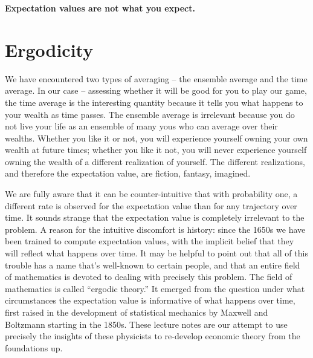 \textbf{Expectation values are not what you expect.}

\section{Ergodicity}

We have encountered two types of averaging -- the ensemble average and the
time average. In our case -- assessing whether it will be good for you to play our 
game, the time average is the interesting quantity because it tells you what happens
to your wealth as time passes. The ensemble average is irrelevant 
because you do not live your life as an ensemble of many yous who can average
over their wealths. Whether you like it or not, you will experience yourself owning 
your own wealth at future times; whether you like it not, you will never experience
yourself owning the wealth of a different realization of yourself. The different realizations,
and therefore the expectation value, are fiction, fantasy, imagined.

We are fully aware that it can be counter-intuitive that with probability one, a different
rate is observed for the expectation value than for any trajectory over time. It sounds
strange that the expectation value is completely irrelevant to the problem. A reason
for the intuitive discomfort is history: since the 1650s we have been trained to
compute expectation values, with the implicit belief that they will reflect what happens
over time. It may be helpful to point out that all of this trouble has a name that's well-known
to certain people, and that an entire field of mathematics is devoted to dealing with
precisely this problem. The field of mathematics is called ``ergodic theory.'' It emerged
from the question under what circumstances the expectation value is informative 
of what happens over time, first raised in the development of statistical mechanics by Maxwell and 
Boltzmann starting in the 1850s. These lecture notes are our attempt to use precisely the insights of these physicists to re-develop economic theory from the foundations up.


